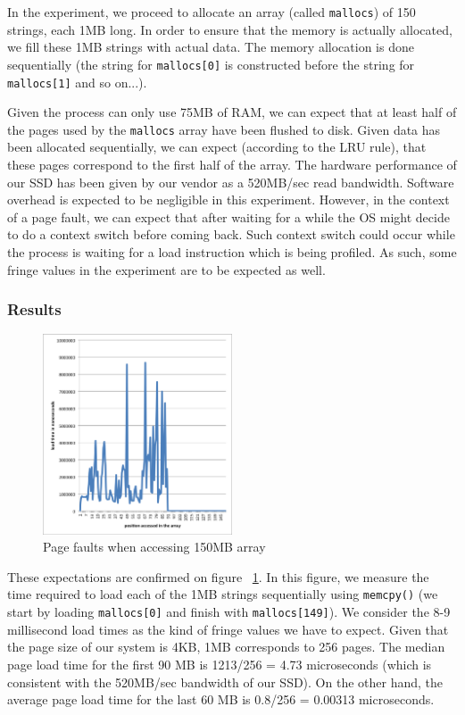 In the experiment, we proceed to allocate an array (called \texttt{mallocs}) of 150 strings, each 1MB long. In order to ensure that the memory is actually allocated, we fill these 1MB strings with actual data. The memory allocation is done sequentially (the string for \texttt{mallocs[0]} is constructed before the string for \texttt{mallocs[1]} and so on...).

Given the process can only use 75MB of RAM, we can expect that at least half of the pages used by the \texttt{mallocs} array have been flushed to disk. Given data has been allocated sequentially, we can expect (according to the LRU rule), that these pages correspond to the first half of the array. The hardware performance of our SSD has been given by our vendor as a 520MB/sec read bandwidth. Software overhead is expected to be negligible in this experiment. However, in the context of a page fault, we can expect that after waiting for a while the OS might decide to do a context switch before coming back. Such context switch could occur while the process is waiting for a load instruction which is being profiled. As such, some fringe values in the experiment are to be expected as well.

\subsubsection{Results}

\begin{figure}
 \centering
  \includegraphics[width=0.5\textwidth]{image/pagefault.png}
  \caption{Page faults when accessing 150MB array}
 \label{fig:pagefault}
\end{figure}

These expectations are confirmed on figure ~\ref{fig:pagefault}. In this figure, we measure the time required to load each of the 1MB strings sequentially using \texttt{memcpy()} (we start by loading \texttt{mallocs[0]} and finish with \texttt{mallocs[149]}). We consider the 8-9 millisecond load times as the kind of fringe values we have to expect.
Given that the page size of our system is 4KB, 1MB corresponds to 256 pages. The median page load time for the first 90 MB is 1213/256 = 4.73  microseconds (which is consistent with the 520MB/sec bandwidth of our SSD). On the other hand, the average page load time for the last 60 MB is 0.8/256 = 0.00313  microseconds. 

